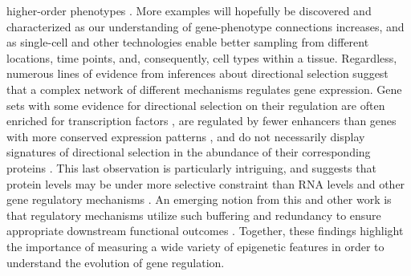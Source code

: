 {higher-order phenotypes \cite{Babbitt et al 2010 (Multiple functional variants in cis modulate PDYN expression), Warner et al. 2009 (Functional consequences of genetic variation in primates on tyrosine hydroxylase (TH) expression in vivo)}. More examples will hopefully be discovered and characterized as our understanding of gene-phenotype connections increases, and as single-cell and other technologies enable better sampling from different locations, time points, and, consequently, cell types within a tissue. Regardless, numerous lines of evidence from inferences about directional selection suggest that a complex network of different mechanisms regulates gene expression. Gene sets with some evidence for directional selection on their regulation are often enriched for transcription factors \cite{Blekhman et al 2008, Gilad et al. 2006 (Expression profiling in primates revels a rapid evolution of human transcription factors)}, are regulated by fewer enhancers than genes with more conserved expression patterns \cite{Danko et al 2018 (Dynamic evolution of regulatory element ensembles in primate CD4+ T cells), Berthelot et al. 2018 (Complexity and conservation of regulatory landscapes underlie evolutionary resilience of...)}, and do not necessarily display signatures of directional selection in the abundance of their corresponding proteins \cite{Khan et al 2013 (Primate transcript and protein expression levels evolve under compensatory selection pressures)}. This last observation is particularly intriguing, and suggests that protein levels may be under more selective constraint than RNA levels and other gene regulatory mechanisms \cite{Wang et al 2018 (Post-translational buffering leads to convergent protein expression levels between primates), Anderson Vigalys and Tung 2020 (Broadening primate genomics: new insights into the ecology and evolution of primate gene regulation)}. An emerging notion from this and other work is that regulatory mechanisms utilize such buffering and redundancy to ensure appropriate downstream functional outcomes \cite{MacNeil and Walhout 2011 (Gene regulatory networks and the role of robustness and stochasticity in the control of gene expression)}. Together, these findings highlight the importance of measuring a wide variety of epigenetic features in order to understand the evolution of gene regulation.

}

